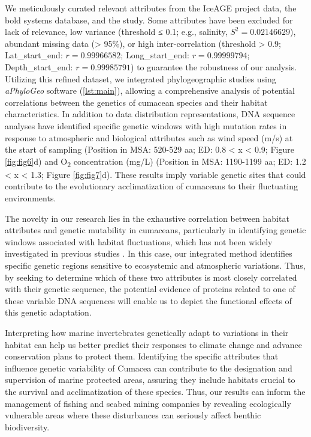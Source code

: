 We meticulously curated relevant attributes from the IceAGE project data, the bold systems database, and the \citep{uhlir_adding_2021} study. Some attributes have been excluded for lack of relevance, low variance (threshold ≤ 0.1; e.g., salinity, $S^2 = 0.02146629$), abundant missing data (> 95\%), or high inter-correlation (threshold > 0.9; Lat_start_end: $r = 0.99966582$; Long_start_end: $r = 0.99999794$; Depth_start_end: $r = 0.99985791$) to guarantee the robustness of our analysis. Utilizing this refined dataset, we integrated phylogeographic studies using \textit{aPhyloGeo} software (\autoref{lst:main}), allowing a comprehensive analysis of potential correlations between the genetics of cumacean species and their habitat characteristics. In addition to data distribution representations, DNA sequence analyses have identified specific genetic windows with high mutation rates in response to atmospheric and biological attributes such as wind speed (m/s) at the start of sampling (Position in MSA: 520-529 aa; ED: 0.8 < x < 0.9; Figure \ref{fig:fig6}d) and O\textsubscript{2} concentration (mg/L) (Position in MSA: 1190-1199 aa; ED: 1.2 < x < 1.3; Figure \ref{fig:fig7}d). These results imply variable genetic sites that could contribute to the evolutionary acclimatization of cumaceans to their fluctuating environments.

The novelty in our research lies in the exhaustive correlation between habitat attributes and genetic mutability in cumaceans, particularly in identifying genetic windows associated with habitat fluctuations, which has not been widely investigated in previous studies \citep{manel2003landscape, vrijenhoek2009cryptic}. In this case, our integrated method identifies specific genetic regions sensitive to ecosystemic and atmospheric variations. Thus, by seeking to determine which of these two attributes is most closely correlated with their genetic sequence, the potential evidence of proteins related to one of these variable DNA sequences will enable us to depict the functional effects of this genetic adaptation.

Interpreting how marine invertebrates genetically adapt to variations in their habitat can help us better predict their responses to climate change and advance conservation plans to protect them. Identifying the specific attributes that influence genetic variability of Cumacea can contribute to the designation and supervision of marine protected areas, assuring they include habitats crucial to the survival and acclimatization of these species. Thus, our results can inform the management of fishing and seabed mining companies by revealing ecologically vulnerable areas where these disturbances can seriously affect benthic biodiversity.


